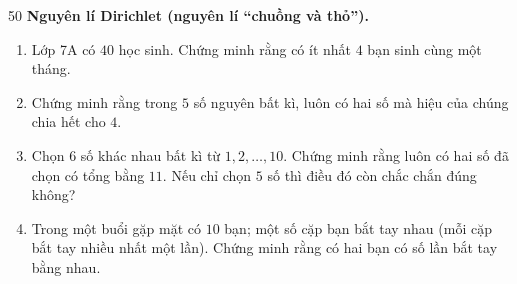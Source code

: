 \begin{probbox}{50}{}
\textbf{Nguyên lí Dirichlet (nguyên lí ``chuồng và thỏ'').}
\begin{enumerate}[label=\alph*),leftmargin=1.6em,itemsep=1pt,topsep=2pt]
  \item Lớp 7A có $40$ học sinh. Chứng minh rằng có ít nhất $4$ bạn sinh cùng một tháng.
  \item Chứng minh rằng trong $5$ số nguyên bất kì, luôn có hai số mà hiệu của chúng chia hết cho $4$.
  \item Chọn $6$ số khác nhau bất kì từ $1, 2, \dots, 10$. Chứng minh rằng luôn có hai số đã chọn có tổng bằng $11$. Nếu chỉ chọn $5$
  số thì điều đó còn chắc chắn đúng không?
  \item Trong một buổi gặp mặt có $10$ bạn; một số cặp bạn bắt tay nhau (mỗi cặp bắt tay nhiều nhất một lần). Chứng minh rằng có hai
  bạn có số lần bắt tay bằng nhau.
\end{enumerate}
\end{probbox}
